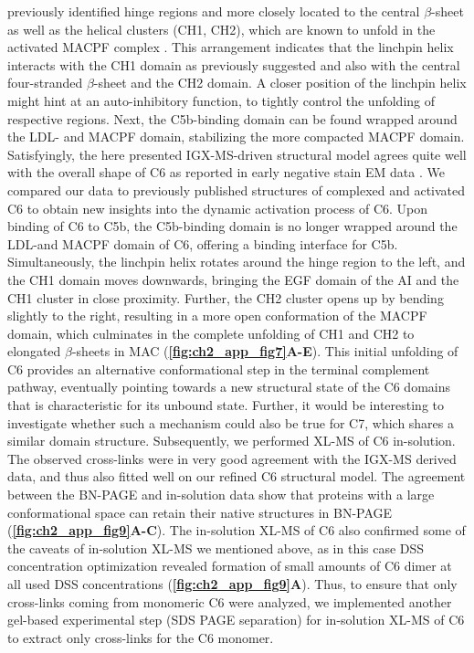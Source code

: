 previously identified hinge regions \cite{Aleshin_2012} and more closely located to the central $\beta$-sheet as well as the helical clusters (CH1, CH2), which are known to unfold in the activated MACPF complex \cite{Menny_2018}. This arrangement indicates that the linchpin helix interacts with the CH1 domain as previously suggested \cite{Aleshin_2012} and also with the central four-stranded $\beta$-sheet and the CH2 domain. A closer position of the linchpin helix might hint at an auto-inhibitory function, to tightly control the unfolding of respective regions. Next, the C5b-binding domain can be found wrapped around the LDL- and MACPF domain, stabilizing the more compacted MACPF domain. Satisfyingly, the here presented IGX-MS-driven structural model agrees quite well with the overall shape of C6 as reported in early negative stain EM data \cite{DiScipio_1989}. We compared our data to previously published structures of complexed and activated C6 to obtain new insights into the dynamic activation process of C6. Upon binding of C6 to C5b, the C5b-binding domain is no longer wrapped around the LDL-and MACPF domain of C6, offering a binding interface for C5b. Simultaneously, the linchpin helix rotates around the hinge region to the left, and the CH1 domain moves downwards, bringing the EGF domain of the AI and the CH1 cluster in close proximity. Further, the CH2 cluster opens up by bending slightly to the right, resulting in a more open conformation of the MACPF domain, which culminates in the complete unfolding of CH1 and CH2 to elongated $\beta$-sheets in MAC (\textbf{\autoref{fig:ch2_app_fig7}A-E}). This initial unfolding of C6 provides an alternative conformational step in the terminal complement pathway, eventually pointing towards a new structural state of the C6 domains that is characteristic for its unbound state. Further, it would be interesting to investigate whether such a mechanism could also be true for C7, which shares a similar domain structure. Subsequently, we performed XL-MS of C6 in-solution. The observed cross-links were in very good agreement with the IGX-MS derived data, and thus also fitted well on our refined C6 structural model. The agreement between the BN-PAGE and in-solution data show that proteins with a large conformational space can retain their native structures in BN-PAGE (\textbf{\autoref{fig:ch2_app_fig9}A-C}). The in-solution XL-MS of C6 also confirmed some of the caveats of in-solution XL-MS we mentioned above, as in this case DSS concentration optimization revealed formation of small amounts of C6 dimer at all used DSS concentrations (\textbf{\autoref{fig:ch2_app_fig9}A}). Thus, to ensure that only cross-links coming from monomeric C6 were analyzed, we implemented another gel-based experimental step (SDS PAGE separation) for in-solution XL-MS of C6 to extract only cross-links for the C6 monomer.

